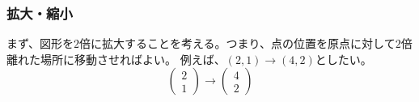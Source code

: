 \documentclass[10pt]{jsarticle}
\theoremstyle{definition}%
\newcommand{\kakko}[1]{\left(#1 \right)} %
\numberwithin{equation}{section}%
\begin{document}
\subsubsection{拡大・縮小}
まず、図形を$2$倍に拡大することを考える。つまり、点の位置を原点に対して$2$倍離れた場所に移動させればよい。
例えば、$(2,1)\to (4,2)$としたい。
\begin{equation}
  \kakko{ 
    \begin{matrix}
      2\\
      1
    \end{matrix}
  } \to 
    \kakko{ 
      \begin{matrix}
        4\\
        2
      \end{matrix}
    } 
\end{equation}
\end{document}
